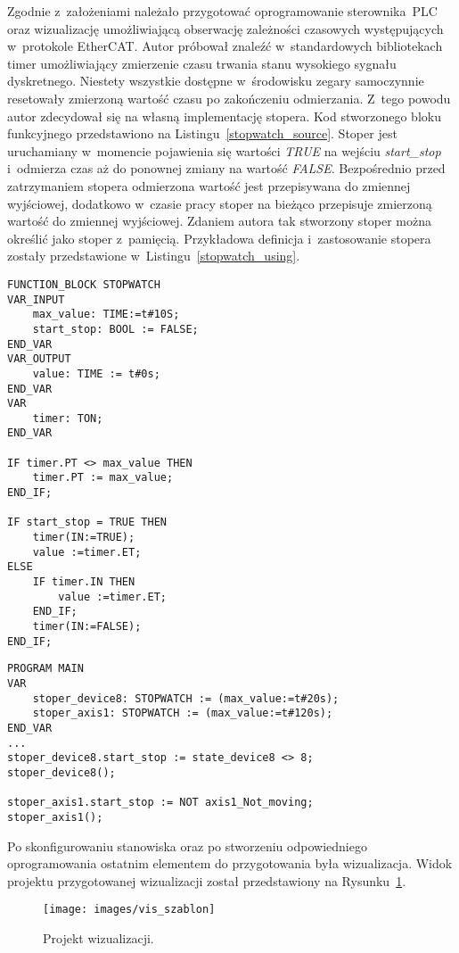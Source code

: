 Zgodnie z~założeniami należało przygotować oprogramowanie sterownika~PLC oraz wizualizację umożliwiającą obserwację zależności czasowych występujących w~protokole EtherCAT. Autor próbował znaleźć w~standardowych bibliotekach timer umożliwiający zmierzenie czasu trwania stanu wysokiego sygnału dyskretnego. Niestety wszystkie dostępne w~środowisku zegary samoczynnie resetowały zmierzoną wartość czasu po zakończeniu odmierzania. Z~tego powodu autor zdecydował się na własną implementację stopera. Kod stworzonego bloku funkcyjnego przedstawiono na Listingu~\ref{stopwatch_source}. Stoper jest uruchamiany w~momencie pojawienia się wartości \textit{TRUE} na wejściu \textit{start\_stop} i~odmierza czas aż do ponownej zmiany na wartość \textit{FALSE}. Bezpośrednio przed zatrzymaniem stopera odmierzona wartość jest przepisywana do zmiennej wyjściowej, dodatkowo w~czasie pracy stoper na bieżąco przepisuje zmierzoną wartość do zmiennej wyjściowej. Zdaniem autora tak stworzony stoper można określić jako stoper z~pamięcią. Przykładowa definicja i~zastosowanie stopera zostały przedstawione w~Listingu~\ref{stopwatch_using}.
\clearpage
\begin{lstlisting}[caption={Kod źródłowy stopera.},label=stopwatch_source]
FUNCTION_BLOCK STOPWATCH
VAR_INPUT
	max_value: TIME:=t#10S;
	start_stop: BOOL := FALSE;
END_VAR
VAR_OUTPUT
	value: TIME := t#0s;
END_VAR
VAR
	timer: TON;
END_VAR

IF timer.PT <> max_value THEN
	timer.PT := max_value;
END_IF;

IF start_stop = TRUE THEN
	timer(IN:=TRUE);
	value :=timer.ET;
ELSE
	IF timer.IN THEN
		value :=timer.ET;
	END_IF;
	timer(IN:=FALSE);
END_IF;
\end{lstlisting}

\begin{lstlisting}[caption={Wywołania odmierzania czasu stworzonym \\ blokiem funkcyjnym \textit{STOPWATCH}.},label=stopwatch_using]
PROGRAM MAIN
VAR
	stoper_device8: STOPWATCH := (max_value:=t#20s);
	stoper_axis1: STOPWATCH := (max_value:=t#120s);
END_VAR	
...
stoper_device8.start_stop := state_device8 <> 8;
stoper_device8();

stoper_axis1.start_stop := NOT axis1_Not_moving;
stoper_axis1();
\end{lstlisting}

Po skonfigurowaniu stanowiska oraz po stworzeniu odpowiedniego oprogramowania ostatnim elementem do przygotowania była wizualizacja. Widok projektu przygotowanej wizualizacji został przedstawiony na Rysunku~\ref{vis_szablon}.
\begin{figure}[!htb] 	\centering 	\texttt{[image: images/vis\_szablon]} \caption{Projekt wizualizacji.} \label{vis_szablon} \end{figure}


